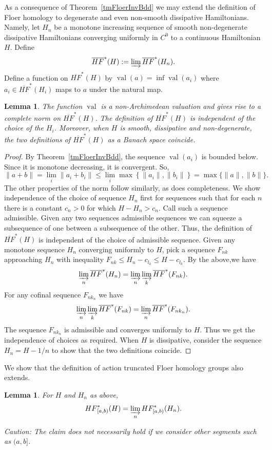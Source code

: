 \documentclass[11pt]{amsart}
\DeclareMathOperator{\val}{val}
\newtheorem{lm}[tm]{Lemma}
\theoremstyle{definition}
\theoremstyle{remark}
\begin{document}
As a consequence of Theorem~\ref{tmFloerInvBdd} we may extend the definition of Floer homology to degenerate and even non-smooth dissipative Hamiltonians. Namely, let $H_n$ be a monotone increasing sequence of smooth non-degenerate dissipative Hamiltonians converging uniformly in $C^0$ to a continuous Hamiltonian $H$. Define
\[
\overline{HF}^*(H):=\varinjlim \overline{HF}^*(H_n).
\]
Define a function on $\overline{HF}^*(H)$ by $\val(a)=\inf\val(a_i)$ where $a_i\in \overline{HF}^*(H_i)$ maps to $a$ under the natural map. \begin{lm}
The function $\val$ is a non-Archimedean valuation and gives rise to a complete norm on $\overline{HF}^*(H)$. The definition of $\overline{HF}^*(H)$ is independent of the choice of the $H_i$. Moreover, when $H$ is smooth, dissipative and non-degenerate, the two definitions of $\overline{HF}^*(H)$ as a Banach space coincide.
\end{lm}
\begin{proof}
 By  Theorem~\ref{tmFloerInvBdd}, the sequence $\val(a_i)$ is bounded below. Since it is monotone decreasing, it is convergent. So,
 \[
 \|a+b\|=\lim_i\|a_i+b_i\|\leq \lim_i\max\left\{\|a_i\|,\|b_i\|\right\}= \max\{\|a\|,\|b\|\}.
 \]
 The other properties of the norm follow similarly, as does completeness. We show independence of the choice of sequence $H_n$ first for sequences such that for each $n$ there is a constant $c_n>0$ for which $H-H_n>c_n$. Call such a sequence admissible.
 Given any two sequences admissible sequences we can squeeze a subsequence of one between a subsequence of the other. Thus, the definition of $\overline{HF}^*(H)$ is independent of the choice of admissible sequence. Given any monotone sequence $H_n$ converging uniformly to $H$, pick a sequence $F_{nk}$ approaching $H_n$ with inequality $F_{nk}\leq H_n-c_{l_k}\leq H-c_{l_k}$. By the above,we have
  \[
  \varinjlim_n \overline{HF}^*(H_n)=\varinjlim_n\varinjlim_k \overline{HF}^*(F_{nk}).
  \]
For any cofinal sequence $F_{nk_n}$ we have
\[
\varinjlim_n\varinjlim_k \overline{HF}^*(F_{nk})=\varinjlim_n \overline{HF}^*(F_{nk_n}).
\]
The sequence $F_{nk_n}$ is admissible and converges uniformly to $H$. Thus we get the independence of choices as required. When $H$ is dissipative, consider the sequence $H_n=H-1/n$ to show that the two definitions coincide.
\end{proof}
 We show that the definition of action truncated Floer homology groups also extends.
\begin{lm}\label{lmAcTruncCont}
For $H$ and $H_n$ as above,
\[
{HF}^*_{[a,b)}(H)=\varinjlim_n HF^*_{[a,b)}(H_n).
\]
\end{lm}
\textit{Caution: The claim does not necessarily hold if we consider other segments such as $(a,b]$.}
\end{document}
